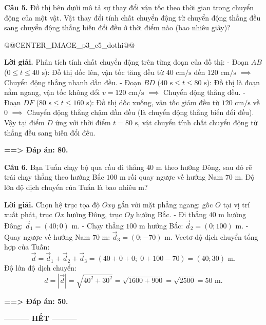 \documentclass[11pt,a4paper]{article}
\begin{document}
\textbf{Câu 5.} Đồ thị bên dưới mô tả sự thay đổi vận tốc theo thời gian trong chuyển động của một vật. Vật thay đổi tính chất chuyển động từ chuyển động thẳng đều sang chuyển động thẳng biến đổi đều ở thời điểm nào (bao nhiêu giây)?

@@CENTER_IMAGE_p3_c5_dothi@@

\textbf{Lời giải.} Phân tích tính chất chuyển động trên từng đoạn của đồ thị:
- Đoạn $AB$ ($0 \le t \le 40\text{ s}$): Đồ thị dốc lên, vận tốc tăng đều từ $40\text{ cm/s}$ đến $120\text{ cm/s}$ $\implies$ Chuyển động thẳng nhanh dần đều.
- Đoạn $BD$ ($40\text{ s} \le t \le 80\text{ s}$): Đồ thị là đoạn nằm ngang, vận tốc không đổi $v = 120\text{ cm/s}$ $\implies$ Chuyển động thẳng đều.
- Đoạn $DF$ ($80\text{ s} \le t \le 160\text{ s}$): Đồ thị dốc xuống, vận tốc giảm đều từ $120\text{ cm/s}$ về $0$ $\implies$ Chuyển động thẳng chậm dần đều (là chuyển động thẳng biến đổi đều).
Vậy tại điểm $D$ ứng với thời điểm $t = 80\text{ s}$, vật chuyển tính chất chuyển động từ thẳng đều sang biến đổi đều.

\textbf{==> Đáp án: 80.}

\textbf{Câu 6.} Bạn Tuấn chạy bộ qua cầu đi thẳng $40\text{ m}$ theo hướng Đông, sau đó rẽ trái chạy thẳng theo hướng Bắc $100\text{ m}$ rồi quay ngược về hướng Nam $70\text{ m}$. Độ lớn độ dịch chuyển của Tuấn là bao nhiêu m?

\textbf{Lời giải.} Chọn hệ trục tọa độ $Oxy$ gắn với mặt phẳng ngang: gốc $O$ tại vị trí xuất phát, trục $Ox$ hướng Đông, trục $Oy$ hướng Bắc.
- Đi thẳng $40\text{ m}$ hướng Đông: $\vec{d}_1 = (40; 0)\text{ m}$.
- Chạy thẳng $100\text{ m}$ hướng Bắc: $\vec{d}_2 = (0; 100)\text{ m}$.
- Quay ngược về hướng Nam $70\text{ m}$: $\vec{d}_3 = (0; -70)\text{ m}$.
Vectơ độ dịch chuyển tổng hợp của Tuấn:
\[
\vec{d} = \vec{d}_1 + \vec{d}_2 + \vec{d}_3 = (40 + 0 + 0;\; 0 + 100 - 70) = (40; 30)\text{ m}.
\]
Độ lớn độ dịch chuyển:
\[
d = |\vec{d}| = \sqrt{40^2 + 30^2} = \sqrt{1600 + 900} = \sqrt{2500} = 50\text{ m}.
\]

\textbf{==> Đáp án: 50.}

\vspace{0.4cm}
\begin{center}
\textbf{--------- HẾT ---------}
\end{center}
\end{document}
